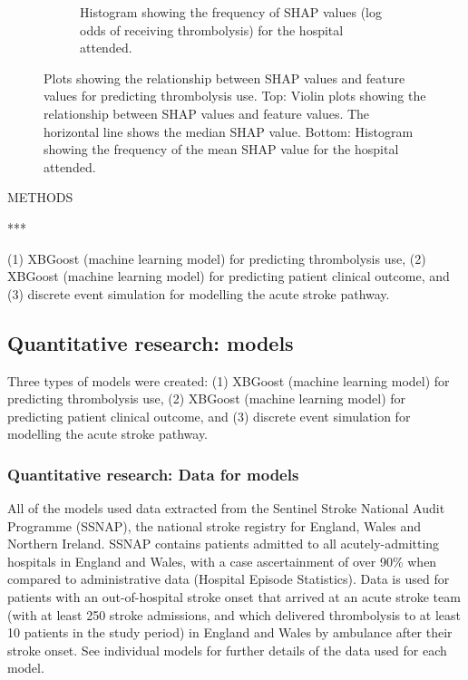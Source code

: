 \begin{figure}
\begin{subfigure}{0.8\textwidth}
    \caption{Histogram showing the frequency of SHAP values (log odds of receiving thrombolysis) for the hospital attended.}
    \label{fig:hospital_shap}
    \end{subfigure}
  \caption{Plots showing the relationship between SHAP values and feature values for predicting thrombolysis use. Top: Violin plots showing the relationship between SHAP values and feature values. The horizontal line shows the median SHAP value. Bottom: Histogram showing the frequency of the mean SHAP value for the hospital attended.}
    \label{fig:shap_outcome_model1}
\end{figure}




METHODS


***


(1) XBGoost  \cite{chen_xgboost_2016} (machine learning model) for predicting thrombolysis use, (2) XBGoost (machine learning model) for predicting patient clinical outcome, and (3) discrete event simulation for modelling the acute stroke pathway. 


\subsection{Quantitative research: models}

Three types of models were created: (1) XBGoost  \cite{chen_xgboost_2016} (machine learning model) for predicting thrombolysis use, (2) XBGoost (machine learning model) for predicting patient clinical outcome, and (3) discrete event simulation for modelling the acute stroke pathway. 

\subsubsection{Quantitative research: Data for models}

All of the models used data extracted from the Sentinel Stroke National Audit Programme (SSNAP), the national stroke registry for England, Wales and Northern Ireland. SSNAP contains patients admitted to all acutely-admitting hospitals in England and Wales, with a case ascertainment of over 90\% when compared to administrative data (Hospital Episode Statistics). Data is used for patients with an out-of-hospital stroke onset that arrived at an acute stroke team (with at least 250 stroke admissions, and which delivered thrombolysis to at least 10 patients in the study period) in England and Wales by ambulance after their stroke onset. See individual models for further details of the data used for each model.

